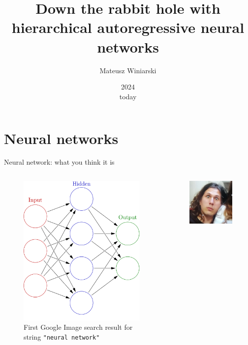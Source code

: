 \documentclass{beamer}
\title{Down the rabbit hole with hierarchical autoregressive neural networks}
\author[M. Winiarski]{Mateusz Winiarski}
\institute[KMPS UJ]{KMPS UJ, WFAIS}
\date[today]{{\SeMPowisko} 2024\\today}
\begin{document}
\frame{\titlepage}

\section{Neural networks}
\begin{frame}{Neural network: what you think it is}
\begin{columns}
\begin{column}{0.5\textwidth}
    \begin{figure}
        \centering
        \includegraphics[width=0.7\linewidth]{neural.png}
        \caption{First Google Image search result for string \texttt{"neural network"}}
    \end{figure}
    \pause
    \end{column}
\begin{column}{0.5\textwidth}
    \begin{figure}
        \centering
        \includegraphics[width=0.9\linewidth]{firlejpatrzy.png}

\end{figure}
\end{column}
\end{columns}
\end{frame}
\end{document}
